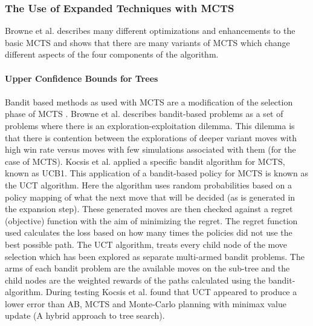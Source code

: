 \documentclass [11pt]{article}
\begin{document}
	\subsubsection{The Use of Expanded Techniques with MCTS}
	Browne et al. \cite{survey} describes many different optimizations and enhancements to the basic MCTS and shows that there are many variants of MCTS which change different aspects of the four components of the algorithm.
	\\\\
	\noindent \textbf{Upper Confidence Bounds for Trees}\\\\
	\noindent Bandit based methods as used with MCTS are a modification of the selection phase of MCTS \cite{survey}. Browne et al. \cite{survey} describes bandit-based problems as a set of problems where there is an exploration-exploitation dilemma. This dilemma is that there is contention between the explorations of deeper variant moves with high win rate versus moves with few simulations associated with them (for the case of MCTS). Kocsis et al. \cite{bandit} applied a specific bandit algorithm for MCTS, known as UCB1. This application of a bandit-based policy for MCTS is known as the UCT algorithm. Here the algorithm uses random probabilities based on a policy mapping of what the next move that will be decided (as is generated in the expansion step). These generated moves are then checked against a regret (objective) function with the aim of minimizing the regret. The regret function used calculates the loss based on how many times the policies did not use the best possible path. The UCT algorithm, treats every child node of the move selection which has been explored as separate multi-armed bandit problems. The arms of each bandit problem are the available moves on the sub-tree and the child nodes are the weighted rewards of the paths calculated using the bandit-algorithm. During testing Kocsis et al. \cite{bandit} found that UCT appeared to produce a lower error than AB, MCTS and Monte-Carlo planning with minimax value update (A hybrid approach to tree search).\\
	
\end{document}
